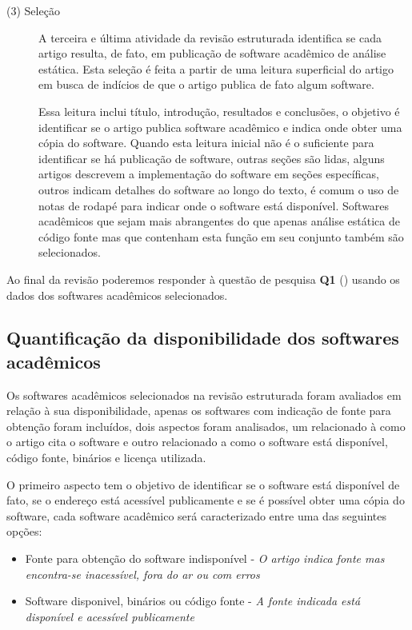 \begin{description}
  \item[(3) Seleção]
    A terceira e última atividade da revisão estruturada identifica se cada
    artigo resulta, de fato, em publicação de software acadêmico de análise
    estática. Esta seleção é feita a partir de uma leitura superficial do
    artigo em busca de indícios de que o artigo publica de fato algum software.

    Essa leitura inclui título, introdução, resultados e conclusões, o objetivo
    é identificar se o artigo publica software acadêmico e indica onde obter
    uma cópia do software. Quando esta leitura inicial não é o suficiente para
    identificar se há publicação de software, outras seções são lidas, alguns
    artigos descrevem a implementação do software em seções específicas, outros
    indicam detalhes do software ao longo do texto, é comum o uso de
    notas de rodapé para indicar onde o software está disponível. Softwares
    acadêmicos que sejam mais abrangentes do que apenas análise estática de
    código fonte mas que contenham esta função em seu conjunto também são
    selecionados.

\end{description}

Ao final da revisão poderemos responder à questão de pesquisa {\bf Q1}
(\QuestaoUm) usando os dados dos softwares acadêmicos selecionados.

\subsection{Quantificação da disponibilidade dos softwares acadêmicos}

Os softwares acadêmicos selecionados na revisão estruturada foram avaliados em
relação à sua disponibilidade, apenas os softwares com indicação de fonte para
obtenção foram incluídos, dois aspectos foram analisados, um relacionado à como
o artigo cita o software e outro relacionado a como o software está disponível,
código fonte, binários e licença utilizada.

O primeiro aspecto tem o objetivo de identificar se o software está disponível
de fato, se o endereço está acessível publicamente e se é possível obter uma
cópia do software, cada software acadêmico será caracterizado entre uma das
seguintes opções:

\begin{itemize}
  \item Fonte para obtenção do software indisponível -
    {\it O artigo indica fonte mas encontra-se inacessível, fora do ar ou com erros}
  \item Software disponivel, binários ou código fonte -
    {\it A fonte indicada está disponível e acessível publicamente}
\end{itemize}

